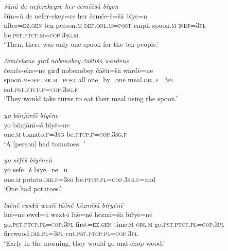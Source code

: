 \ea \label{ŽE.28}
\textit{šūnū de neferekeyre her čemčēšā bīyen} \\ 
\gll šūn=ū de nefer-ekey=re her čemče-ē=šā bīye=n \\ 
 after\textsc{\textsc{=ez.gen}} ten person\textsc{.m}\textsc{-def}\textsc{.obl}\textsc{.m}\textsc{=\textsc{post}} emph spoon\textsc{.m}\textsc{-indf}\textsc{=3pl} be\textsc{.pst}\textsc{.ptcp}\textsc{.m}\textsc{=cop}\textsc{.3sg}\textsc{.m} \\ 
\glt `Then, there was only one spoon for the ten people.'
\z 
 
\ea \label{ŽE.29}
\textit{čemčekene girđ nobenobey čāštīšā wārdēne} \\ 
\gll čemče-eke=ne girđ nobenobey čāštī=šā wārdē=ne \\ 
 spoon\textsc{.m}\textsc{-def}\textsc{.dir}\textsc{.m}\textsc{=\textsc{post}} all one\_by\_one meal\textsc{.obl}\textsc{.f}\textsc{=3pl} eat\textsc{.pst}\textsc{.ptcp}\textsc{.f}\textsc{=cop}\textsc{.3sg}\textsc{.f} \\ 
\glt `They would take turns to eat their meal using the spoon.'
\z 
 
\ea \label{ŽE.31}
\textit{yo bānjānīš bīyēne} \\ 
\gll yo bānjānī=š bīyē=ne \\ 
 one\textsc{.m} tomato\textsc{.f}\textsc{=3sg} be\textsc{.ptcp}\textsc{.f}\textsc{=cop}\textsc{.3sg}\textsc{.f} \\ 
\glt `A [person] had tomatoes. '
\z 
 
\ea \label{ŽE.32}
\textit{yo sēfēš bīyēneū} \\ 
\gll yo sēfē=š bīyē=ne=ū \\ 
 one\textsc{.m} potato\textsc{.dir}\textsc{.f}\textsc{=3sg} be\textsc{.ptcp}\textsc{.pl}\textsc{=cop}\textsc{.3sg}\textsc{.f}=and \\ 
\glt `One had potatoes.'
\z 
 
\ea \label{ŽE.33}
\textit{luēnē eweɫū wextī lūēnē hēzmīšā biřyēnē} \\ 
\gll luē=nē eweɫ=ū wext-ī lūē=nē hēzmī=šā biřyē=nē \\ 
 go\textsc{.pst}\textsc{.ptcp}\textsc{.pl}\textsc{=cop}\textsc{.3pl} first\textsc{\textsc{=ez.gen}} time\textsc{.m}\textsc{-obl}\textsc{.m} go\textsc{.pst}\textsc{.ptcp}\textsc{.pl}\textsc{=cop}\textsc{.3pl} firewood\textsc{.dir}\textsc{.pl}\textsc{=3pl} cut\textsc{.pst}\textsc{.ptcp}\textsc{.pl}\textsc{=cop}\textsc{.3pl} \\ 
\glt `Early in the morning, they would go and chop wood.'
\z 
 

